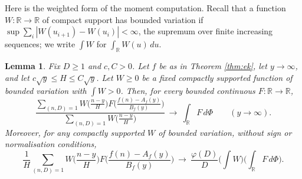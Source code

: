 \documentclass[11pt,reqno]{amsart}
\theoremstyle{plain}
\newtheorem{lemma}[theorem]{Lemma}
\theoremstyle{definition}
\newcommand{\R}{\mathbb{R}}
\begin{document}
Here is the weighted form of the moment computation. Recall that a function $W\colon\R\to\R$ of compact support has bounded variation if $\sup\sum_i|W(u_{i+1})-W(u_i)|<\infty$, the supremum over finite increasing sequences; we write $\int W$ for $\int_\R W(u)\,du$.

\begin{lemma}\label{lem:ek}
Fix $D\ge1$ and $c,C>0$. Let $f$ be as in Theorem \ref{thm:ek}, let $y\to\infty$, and let $c\sqrt y\le H\le C\sqrt y$. Let $W\ge0$ be a fixed compactly supported function of bounded variation with $\int W>0$. Then, for every bounded continuous $F\colon\R\to\R$,
\begin{equation}\label{eq:ekweighted}
\frac{\displaystyle\sum_{(n,D)=1}W\Big(\frac{n-y}H\Big)F\Big(\frac{f(n)-A_f(y)}{B_f(y)}\Big)}
{\displaystyle\sum_{(n,D)=1}W\Big(\frac{n-y}H\Big)}
\ \longrightarrow\ \int_\R F\,d\Phi
\qquad(y\to\infty).
\end{equation}
Moreover, for any compactly supported $W$ of bounded variation, without sign or normalisation conditions,
\begin{equation}\label{eq:eksigned}
\frac1H\sum_{(n,D)=1}W\Big(\frac{n-y}H\Big)F\Big(\frac{f(n)-A_f(y)}{B_f(y)}\Big)
\ \longrightarrow\ \frac{\varphi(D)}D\Big(\int W\Big)\Big(\int_\R F\,d\Phi\Big).
\end{equation}
\end{lemma}
\end{document}
